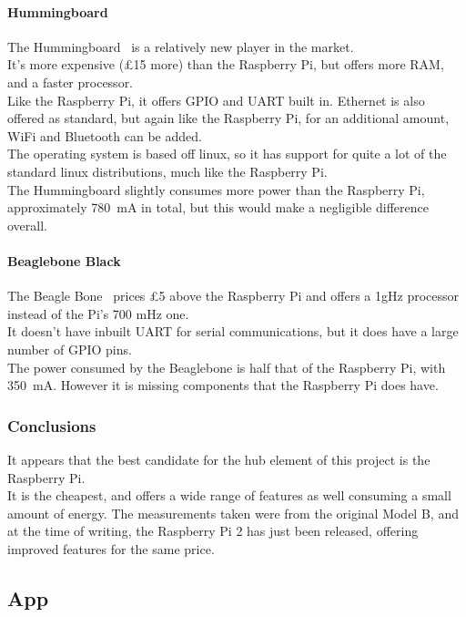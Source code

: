 \documentclass[preprint,12pt,3p]{elsarticle}
\begin{document}
\paragraph{Hummingboard}
The Hummingboard~\cite{hummingboard} is a relatively new player in the market.\\
It's more expensive (\pounds15 more) than the Raspberry Pi, but offers more RAM, and a faster processor.\\
Like the Raspberry Pi, it offers GPIO and UART built in. Ethernet is also offered as standard, but again like the Raspberry Pi, for an additional amount, WiFi and Bluetooth can be added.\\
The operating system is based off linux, so it has support for quite a lot of the standard linux distributions, much like the Raspberry Pi.\\
The Hummingboard slightly consumes more power than the Raspberry Pi, approximately \SI{780}{\milli\ampere} in total, but this would make a negligible difference overall.
\paragraph{Beaglebone Black}
The Beagle Bone~\cite{beaglebone} prices \pounds5 above the Raspberry Pi and offers a 1gHz processor instead of the Pi's 700 mHz one.\\
It doesn't have inbuilt UART for serial communications, but it does have a large number of GPIO pins.\\
The power consumed by the Beaglebone is half that of the Raspberry Pi, with \SI{350}{\milli\ampere}. However it is missing components that the Raspberry Pi does have.

\subsubsection{Conclusions}
It appears that the best candidate for the hub element of this project is the Raspberry Pi.\\
It is the cheapest, and offers a wide range of features as well consuming a small amount of energy. The measurements taken were from the original Model B, and at the time of writing, the Raspberry Pi 2 has just been released, offering improved features for the same price.





\subsection{App}
\end{document}
